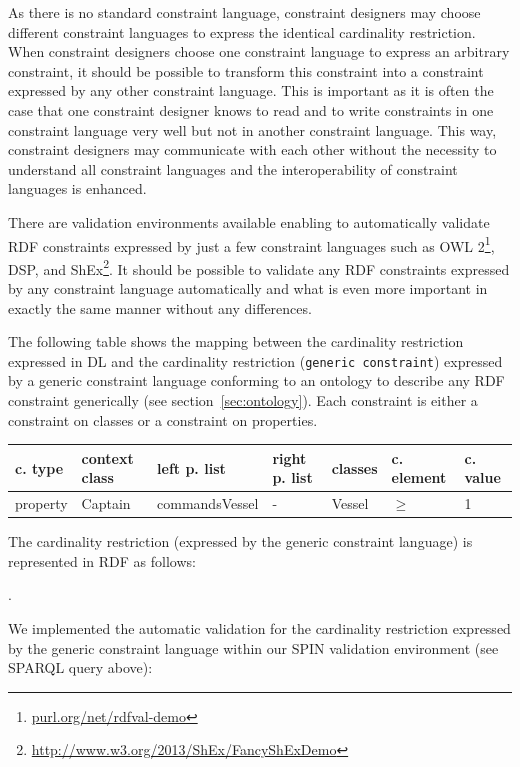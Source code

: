 \documentclass{llncs}
\newcommand{\ms}[1]{\texttt{#1}}
\newenvironment{gcotable}{
  \scriptsize
  \sffamily
  \vspace{0.3cm}
	\begin{center}
  \begin{tabular}{l|l|l|l|l|l|l}
  \hline
  \textbf{c. type} & \textbf{context class} & \textbf{left p. list} & \textbf{right p. list} & \textbf{classes} & \textbf{c. element} & \textbf{c. value} \\
  \hline

}{
  \hline
  \end{tabular}
	\end{center}
}
\begin{document}
As there is no standard constraint language, constraint designers may choose different constraint languages to express the identical cardinality restriction. 
When constraint designers choose one constraint language to express an arbitrary constraint, it should be possible to transform this constraint into a constraint expressed by any other constraint language. 
This is important as it is often the case that one constraint designer knows to read and to write constraints in one constraint language very well but not in another constraint language. 
This way, constraint designers may communicate with each other without the necessity to understand all constraint languages and the interoperability of constraint languages is enhanced.


There are validation environments available enabling to automatically validate RDF constraints expressed by just a few constraint languages such as OWL 2\footnote{\url{purl.org/net/rdfval-demo}\label{footnote1}}, DSP, and ShEx\footnote{\url{http://www.w3.org/2013/ShEx/FancyShExDemo}}.
It should be possible to validate any RDF constraints expressed by any constraint language automatically and what is even more important in exactly the same manner without any differences.  

The following table shows the mapping between the cardinality restriction expressed in DL and the cardinality restriction (\ms{generic constraint}) expressed by a generic constraint language conforming to an ontology to describe any RDF constraint generically (see section~\ref{sec:ontology}).
Each constraint is either a constraint on classes or a constraint on properties.

\begin{gcotable}
property & Captain & commandsVessel & - & Vessel & $\geq$ & 1 \\
\end{gcotable}

The cardinality restriction (expressed by the generic constraint language) is represented in RDF as follows:

\begin{ex}
[   a PropertyConstraint ;
    contextClass StarFleetCaptain ;
    leftProperties ( commandsVessel ) ;
    classes ( Vessel ) ;
    constrainingElement ">=" ;
    constrainingValue "1" ] .
\end{ex}

We implemented the automatic validation for the cardinality restriction expressed by the generic constraint language within our SPIN validation environment (see SPARQL query above):
\end{document}
